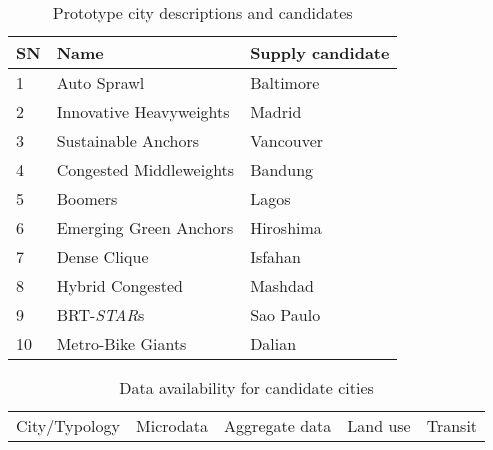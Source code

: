 \documentclass[11pt,twoside]{article}
\numberwithin{equation}{section}
\newcommand{\?}{\stackrel{?}{=}}
\begin{document}
\begin{table}[h!]
  \centering
  \begin{tabular}{l l l}\toprule
    \bf SN &\bf Name &\bf Supply candidate \\\midrule
    1 & Auto Sprawl & Baltimore \\
    2 & Innovative Heavyweights & Madrid \\
    3 & Sustainable Anchors & Vancouver \\
    4 & Congested Middleweights & Bandung \\
    5 & Boomers & Lagos \\
    6 & Emerging Green Anchors & Hiroshima \\
    7 & Dense Clique & Isfahan\\
    8 & Hybrid Congested & Mashdad \\
    9 & BRT-{\it STAR}s & Sao Paulo  \\
    10 & Metro-Bike Giants & Dalian \\ \bottomrule
  \end{tabular}
  \caption{Prototype city descriptions and candidates}
  \label{tab:proto}
\end{table}


\begin{table}[h!]
  \centering
  \begin{tabular}{l l l l l }
    City/Typology & Microdata & Aggregate data & Land use & Transit \\
  \end{tabular}
  \caption{Data availability for candidate cities}
  \label{tab:avail}
\end{table}


\end{document}
